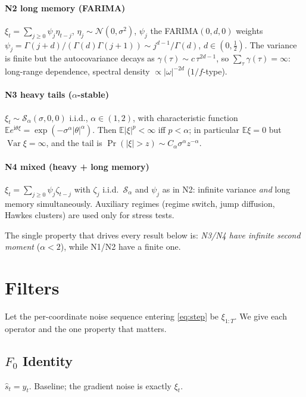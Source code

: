 \documentclass[conference]{IEEEtran}
\newcommand{\E}{\mathbb{E}}
\newcommand{\Sstable}{\mathcal{S}_\alpha}
\DeclareMathOperator{\Var}{Var}
\begin{document}
\paragraph*{N2 long memory (FARIMA)}
$\xi_t=\sum_{j\ge0}\psi_j\eta_{t-j}$, $\eta_j\sim\mathcal N(0,\sigma^2)$,
$\psi_j$ the FARIMA$(0,d,0)$ weights $\psi_j=\Gamma(j+d)/(\Gamma(d)\Gamma(j+1))
\sim j^{d-1}/\Gamma(d)$, $d\in(0,\tfrac12)$. The variance is finite but
the autocovariance decays as $\gamma(\tau)\sim c\,\tau^{2d-1}$, so
$\sum_\tau\gamma(\tau)=\infty$: long-range dependence, spectral density
$\propto|\omega|^{-2d}$ ($1/f$-type).

\paragraph*{N3 heavy tails ($\alpha$-stable)}
$\xi_t\sim\Sstable(\sigma,0,0)$ i.i.d., $\alpha\in(1,2)$, with
characteristic function $\E e^{\mathrm{i}\theta\xi}=\exp(-\sigma^\alpha
|\theta|^\alpha)$. Then $\E|\xi|^p<\infty$ iff $p<\alpha$; in
particular $\E\xi=0$ but $\Var\xi=\infty$, and the tail is
$\Pr(|\xi|>z)\sim C_\alpha\sigma^\alpha z^{-\alpha}$.

\paragraph*{N4 mixed (heavy + long memory)}
$\xi_t=\sum_{j\ge0}\psi_j\zeta_{t-j}$ with $\zeta_j$ i.i.d.\
$\Sstable$ and $\psi_j$ as in N2: infinite variance \emph{and} long
memory simultaneously. Auxiliary regimes (regime switch, jump
diffusion, Hawkes clusters) are used only for stress tests.

The single property that drives every result below is: \emph{N3/N4
have infinite second moment} ($\alpha<2$), while N1/N2 have a finite
one.

\section{Filters}

Let the per-coordinate noise sequence entering \eqref{eq:step} be
$\xi_{1:T}$. We give each operator and the one property that matters.

\subsection{$F_0$ Identity}
$\hat s_t=y_t$. Baseline; the gradient noise is exactly $\xi_t$.
\end{document}
